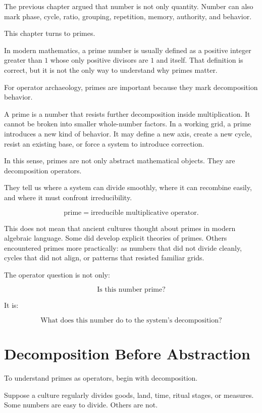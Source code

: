 \documentclass[11pt]{book}
\begin{document}
The previous chapter argued that number is not only quantity. Number can also mark phase, cycle, ratio, grouping, repetition, memory, authority, and behavior.

This chapter turns to primes.

In modern mathematics, a prime number is usually defined as a positive integer greater than \(1\) whose only positive divisors are \(1\) and itself. That definition is correct, but it is not the only way to understand why primes matter.

For operator archaeology, primes are important because they mark decomposition behavior.

A prime is a number that resists further decomposition inside multiplication. It cannot be broken into smaller whole-number factors. In a working grid, a prime introduces a new kind of behavior. It may define a new axis, create a new cycle, resist an existing base, or force a system to introduce correction.

In this sense, primes are not only abstract mathematical objects. They are decomposition operators.

They tell us where a system can divide smoothly, where it can recombine easily, and where it must confront irreducibility.

\[
\text{prime} = \text{irreducible multiplicative operator}.
\]

This does not mean that ancient cultures thought about primes in modern algebraic language. Some did develop explicit theories of primes. Others encountered primes more practically: as numbers that did not divide cleanly, cycles that did not align, or patterns that resisted familiar grids.

The operator question is not only:

\[
\text{Is this number prime?}
\]

It is:

\[
\text{What does this number do to the system's decomposition?}
\]

\section{Decomposition Before Abstraction}

To understand primes as operators, begin with decomposition.

Suppose a culture regularly divides goods, land, time, ritual stages, or measures. Some numbers are easy to divide. Others are not.
\end{document}
